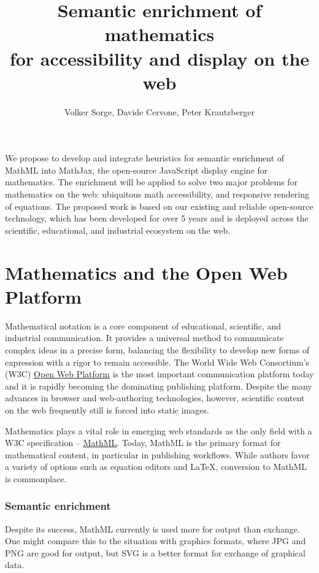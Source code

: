 \documentclass[12pt]{amsart}
\title{Semantic enrichment of mathematics \\ for accessibility and display on 
the web}
\author{Volker Sorge, Davide Cervone, Peter Krautzberger}
\begin{document}
\doublespacing
\maketitle


We propose to develop and integrate heuristics for semantic enrichment of MathML 
into MathJax, the open-source JavaScript display engine for mathematics. The 
enrichment will be applied to solve two major problems for mathematics on the 
web: ubiquitous math accessibility, and responsive rendering of equations. The 
proposed work is based on our existing and reliable open-source technology, which 
has been developed for over 5 years and is deployed across the scientific, 
educational, and industrial ecosystem on the web.

\section{Mathematics and the Open Web Platform}

Mathematical notation is a core component of educational, scientific, and 
industrial communication. It provides a universal method to communicate complex 
ideas in a precise form, balancing the flexibility to develop new forms of 
expression with a rigor to remain accessible. The World Wide Web Consortium's 
(W3C) \href{https://en.wikipedia.org/wiki/Open_Web_Platform}{Open Web Platform} 
is the most important communication platform today and it is rapidly becoming 
the dominating publishing platform. Despite the many advances in
browser and web-authoring technologies, however, 
scientific content on the web frequently still is forced 
into static images. 

Mathematics plays a vital role in emerging web standards as the only field with 
a W3C specification -- \href{http://www.w3.org/Math/draft-spec/}{MathML}. Today, 
MathML is the primary format for mathematical content, in 
particular in publishing workflows. While authors favor a variety of options 
such as equation editors and \LaTeX, conversion to MathML is commonplace.

\subsubsection*{Semantic enrichment}

Despite its success, MathML currently is used more for output than
exchange.  One might compare this to the situation with graphics
formats, where JPG and PNG are good for output, but SVG is a better
format for exchange of graphical data.
\end{document}
